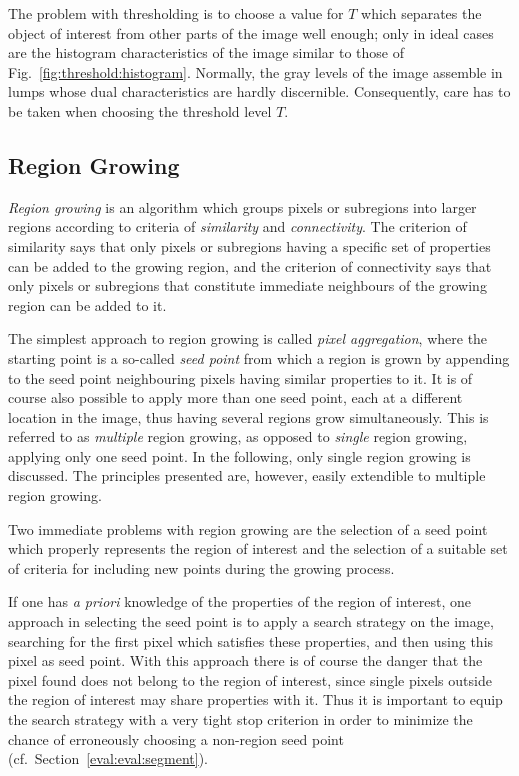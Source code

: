 The problem with thresholding is to choose a value for $T$ which
separates the object of interest from other parts of the image well
enough; only in ideal cases are the histogram characteristics of the
image similar to those of Fig.~\ref{fig:threshold:histogram}.
Normally, the gray levels of the image assemble in lumps whose dual
characteristics are hardly discernible.  Consequently, care has to be
taken when choosing the threshold level $T$.

\subsection{Region Growing}
\label{image:segment:region}

{\em Region growing\/} is an algorithm which groups pixels or
subregions into larger regions according to criteria of {\em
  similarity\/} and {\em connectivity\/}.  The criterion of similarity
says that only pixels or subregions having a specific set of
properties can be added to the growing region, and the criterion of
connectivity says that only pixels or subregions that constitute
immediate neighbours of the growing region can be added to it.

The simplest approach to region growing is called {\em pixel
  aggregation\/}, where the starting point is a so-called {\em seed
  point\/} from which a region is grown by appending to the seed point
neighbouring pixels having similar properties to it.  It is of course
also possible to apply more than one seed point, each at a different
location in the image, thus having several regions grow
simultaneously.  This is referred to as {\em multiple\/} region
growing, as opposed to {\em single\/} region growing, applying only
one seed point.  In the following, only single region growing is
discussed.  The principles presented are, however, easily extendible
to multiple region growing.

Two immediate problems with region growing are the selection of a seed
point which properly represents the region of interest and the
selection of a suitable set of criteria for including new points
during the growing process.

If one has {\em a priori\/} knowledge of the properties of the region
of interest, one approach in selecting the seed point is to apply a
search strategy on the image, searching for the first pixel which
satisfies these properties, and then using this pixel as seed point.
With this approach there is of course the danger that the pixel found
does not belong to the region of interest, since single pixels outside
the region of interest may share properties with it.  Thus it is
important to equip the search strategy with a very tight stop
criterion in order to minimize the chance of erroneously choosing a
non-region seed point (cf.\ Section~\ref{eval:eval:segment}).

